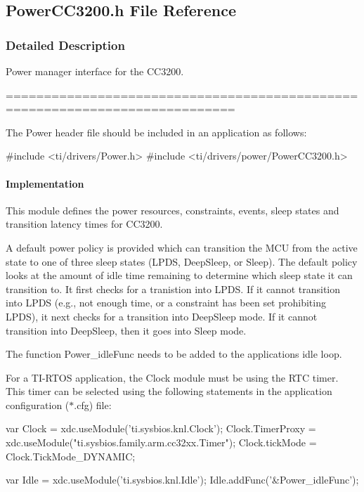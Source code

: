 \subsection{Power\+C\+C3200.\+h File Reference}
\label{_power_c_c3200_8h}


\subsubsection{Detailed Description}
Power manager interface for the C\+C3200. 

============================================================================

The Power header file should be included in an application as follows\+: 
\begin{DoxyCode}
\textcolor{preprocessor}{#include <ti/drivers/Power.h>}
\textcolor{preprocessor}{#include <ti/drivers/power/PowerCC3200.h>}
\end{DoxyCode}


\paragraph*{Implementation}

This module defines the power resources, constraints, events, sleep states and transition latency times for C\+C3200.

A default power policy is provided which can transition the M\+C\+U from the active state to one of three sleep states (L\+P\+D\+S, Deep\+Sleep, or Sleep). The default policy looks at the amount of idle time remaining to determine which sleep state it can transition to. It first checks for a tranistion into L\+P\+D\+S. If it cannot transition into L\+P\+D\+S (e.\+g., not enough time, or a constraint has been set prohibiting L\+P\+D\+S), it next checks for a transition into Deep\+Sleep mode. If it cannot transition into Deep\+Sleep, then it goes into Sleep mode.

The function \textquotesingle{}Power\+\_\+idle\+Func\textquotesingle{} needs to be added to the application\textquotesingle{}s idle loop.

For a T\+I-\/\+R\+T\+O\+S application, the Clock module must be using the R\+T\+C timer. This timer can be selected using the following statements in the application configuration ($\ast$.cfg) file\+:


\begin{DoxyCode}
var Clock = xdc.useModule(\textcolor{stringliteral}{'ti.sysbios.knl.Clock'});
Clock.TimerProxy = xdc.useModule(\textcolor{stringliteral}{"ti.sysbios.family.arm.cc32xx.Timer"});
Clock.tickMode = Clock.TickMode\_DYNAMIC;

var Idle = xdc.useModule(\textcolor{stringliteral}{'ti.sysbios.knl.Idle'});
Idle.addFunc(\textcolor{stringliteral}{'&Power\_idleFunc'});
\end{DoxyCode}
 

